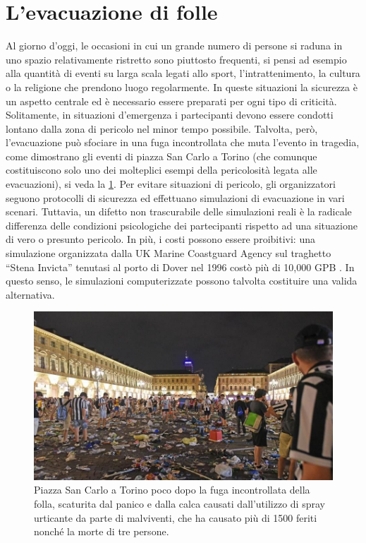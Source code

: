 \documentclass[12pt,a4paper,openright,oneside]{book}
\begin{document}
\section{L'evacuazione di folle}
Al giorno d’oggi, le occasioni in cui un grande numero di persone si raduna in uno spazio relativamente ristretto sono piuttosto frequenti, si pensi ad esempio alla quantità di eventi su larga scala legati allo sport, l’intrattenimento, la cultura o la religione che prendono luogo regolarmente. In queste situazioni la sicurezza è un aspetto centrale ed è necessario essere preparati per ogni tipo di criticità. Solitamente, in situazioni d’emergenza i partecipanti devono essere condotti lontano dalla zona di pericolo nel minor tempo possibile. Talvolta, però, l’evacuazione può sfociare in una fuga incontrollata che muta l’evento in tragedia, come dimostrano gli eventi di piazza San Carlo a Torino (che comunque costituiscono solo uno dei molteplici esempi della pericolosità legata alle evacuazioni), si veda la \cref{fig:piazza-san-carlo}. Per evitare situazioni di pericolo, gli organizzatori seguono protocolli di sicurezza ed effettuano simulazioni di evacuazione in vari scenari. Tuttavia, un difetto non trascurabile delle simulazioni reali è la radicale differenza delle condizioni psicologiche dei partecipanti rispetto ad una situazione di vero o presunto pericolo. In più, i costi possono essere proibitivi: una simulazione organizzata dalla UK Marine Coastguard Agency sul traghetto “Stena Invicta” tenutasi al porto di Dover nel 1996 costò più di 10,000 GPB \cite{MSAEvacuationSimulation}. In questo senso, le simulazioni computerizzate possono talvolta costituire una valida alternativa.
\begin{figure}
	\centering
	\includegraphics[width=0.8\linewidth]{figures/piazza-san-carlo.jpeg}
	\caption{Piazza San Carlo a Torino poco dopo la fuga incontrollata della folla, scaturita dal panico e dalla calca causati dall'utilizzo di spray urticante da parte di malviventi, che ha causato più di 1500 feriti nonché la morte di tre persone.}
	\label{fig:piazza-san-carlo}
\end{figure}
\end{document}

